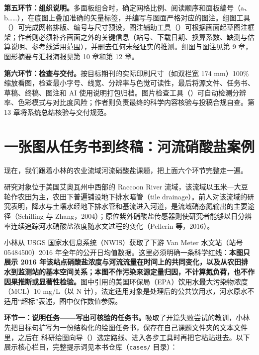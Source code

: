 \textbf{第五环节：组织说明。}多面板组合时，确定网格比例、阅读顺序和面板编号（a、b……），在底图上叠加准确的矢量标签，并编写与图面严格对应的图注。组图工具（）可完成网格排版、编号与尺寸预设，图注辅助工具（）可根据画面起草图注框架；作者则必须补齐画面之外的关键信息（站号、下载日期、换算系数、缺测与估算说明、参考线适用范围），并删去任何未经证实的推测。组图与图注见第 9 章，图形摘要与汇报海报见第 10 章和第 12 章。

\textbf{第六环节：检查与交付。}按目标期刊的实际印刷尺寸（如双栏宽 174 mm）100\% 缩放看图，检查最小字号、线宽、分辨率与色觉可读性，最后将源文件、任务书、草稿、终稿、图注和 AI 使用说明打包归档。图片检查工具（）可自动检测分辨率、色彩模式与对比度风险；作者则负责最终的科学内容核验与投稿合规自查。第 13 章将系统总结核验与交付规范。

\section{一张图从任务书到终稿：河流硝酸盐案例}

现在，我们跟着小林的农业流域河流硝酸盐课题，把上面六个环节完整走一遍。

研究对象位于美国艾奥瓦州中西部的 Raccoon River 流域，该流域以玉米—大豆轮作农田为主，农田下普遍铺设地下排水暗管（tile drainage）。前人对该流域的研究表明，降水与土壤水经地下排水管和基流进入河道，是流域硝态氮输出的主要途径（Schilling 与 Zhang，2004）；原位紫外硝酸盐传感器则使研究者能够以日分辨率连续追踪河水硝酸盐浓度随水文过程的变化（Pellerin 等，2016）。

小林从 USGS 国家水信息系统（NWIS）获取了下游 Van Meter 水文站（站号 05484500）2016 年全年的公开日均值数据。这里必须明确一条科学红线：\textbf{本图只展示 2016 年该站点硝酸盐浓度与河流流量在时间上的共同变化，以及从农田排水到监测站的基本空间关系；本图不作污染来源定量归因，不计算氮负荷，也不作因果推断或显著性检验。}图中引用的美国环保局（EPA）饮用水最大污染物浓度（MCL）10 mg/L（以 N 计），法定适用对象是处理后的公共饮用水，河水原水不适用“超标”表述，图中仅作数值参照。

\textbf{环节一：说明任务——写出可核验的任务书。}吸取了开篇失败尝试的教训，小林先把目标句扩写为一份结构化的绘图任务书，保存在自己课题文件夹的文本文件里，之后在 \scidraw{} 科研绘图向导（）选定路线、进入各步工具时再把它粘贴进去。以下展示核心栏目，完整提示词见本书仓库（\texttt{cases/} 目录）：


